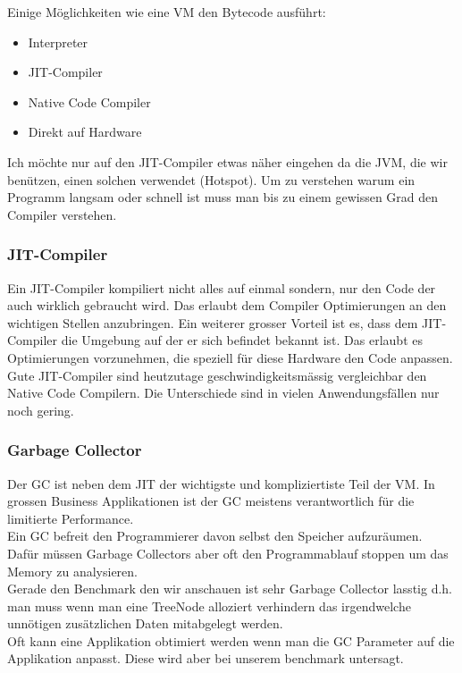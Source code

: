 \documentclass{fancydocument}
\begin{document}
Einige Möglichkeiten wie eine VM den Bytecode ausführt:


\begin{itemize}
\item Interpreter
\item JIT-Compiler
\item Native Code Compiler
\item Direkt auf Hardware
\end{itemize}

Ich m\"ochte nur auf den JIT-Compiler etwas n\"aher eingehen da die JVM,
die wir ben\"utzen, einen solchen verwendet (Hotspot). Um zu verstehen warum ein
Programm langsam oder schnell ist muss man bis zu einem gewissen Grad
den Compiler verstehen.

\subsubsection{JIT-Compiler}

Ein JIT-Compiler kompiliert nicht alles auf einmal sondern, nur den
Code der auch wirklich gebraucht wird. Das erlaubt dem Compiler
Optimierungen an den wichtigen Stellen anzubringen. Ein weiterer
grosser Vorteil ist es, dass dem JIT-Compiler die Umgebung auf der er
sich befindet bekannt ist. Das erlaubt es Optimierungen vorzunehmen,
die speziell für diese Hardware den Code anpassen.
\\
Gute JIT-Compiler sind heutzutage geschwindigkeitsmässig vergleichbar den Native Code Compilern. Die Unterschiede sind in vielen
Anwendungsf\"allen nur noch gering.

\subsubsection{Garbage Collector}

Der GC ist neben dem JIT der wichtigste und kompliziertiste Teil der
VM. In grossen Business Applikationen ist der GC meistens
verantwortlich f\"ur die limitierte Performance.
\\
Ein GC befreit den Programmierer davon selbst den Speicher
aufzur\"aumen. Daf\"ur m\"ussen Garbage Collectors aber oft den
Programmablauf stoppen um das Memory zu analysieren.
\\
Gerade den Benchmark den wir anschauen ist sehr Garbage Collector
lasstig d.h. man muss wenn man eine TreeNode alloziert verhindern das
irgendwelche unnötigen zus\"atzlichen Daten mitabgelegt werden.
\\
Oft kann eine Applikation obtimiert werden wenn man die GC Parameter
auf die Applikation anpasst. Diese wird aber bei unserem benchmark
untersagt.
\end{document}
